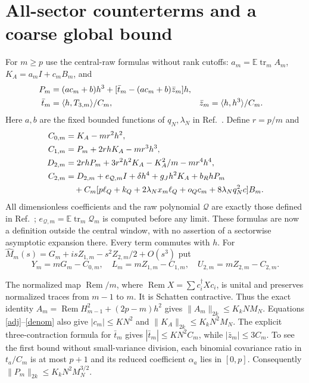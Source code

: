 \documentclass[11pt,a4paper]{article}
\newcommand{\EE}{\mathbb E}
\newcommand{\tr}{\operatorname{tr}}
\newcommand{\Rem}{\operatorname{Rem}}
\begin{document}
\newpage
\section{All-sector counterterms and a coarse global bound}
For $m\ge p$ use the central-raw formulas without rank cutoffs:
$a_m=\EE\tr_m A_m$, $K_A=a_mI+c_mB_m$, and
\begin{align}
 P_m&=(ac_m+b)h^3+[\bar t_m-(ac_m+b)\bar z_m]h,\notag\\
 \bar t_m&=\langle h,T_{3,m}\rangle/C_m,
 &\bar z_m&=\langle h,h^3\rangle/C_m.
\end{align}
Here $a,b$ are the fixed bounded functions of $q_N,\lambda_N$
in Ref.~\cite{central}. Define $r=p/m$ and
\begin{align}
 C_{0,m}&=K_A-mr^2h^2,\notag\\
 C_{1,m}&=P_m+2rhK_A-mr^3h^3,\notag\\
 D_{2,m}&=2rhP_m+3r^2h^2K_A-K_A^2/m-mr^4h^4,\notag\\
 C_{2,m}&=D_{2,m}+e_{\mathcal Q,m}I+\delta h^4
                 +g_Jh^2K_A+b_RhP_m\notag\\
 &\quad+C_m[p\ell_Q+k_Q+2\lambda_Nx_m\ell_Q
                  +o_Qc_m+8\lambda_Nq_N^2c]B_m.\label{C2}
\end{align}
All dimensionless coefficients and the raw polynomial
$\mathcal Q$ are exactly those defined in Ref.~\cite{central};
$e_{\mathcal Q,m}=\EE\tr_m\mathcal Q_m$ is computed before any
limit. These formulas are now a definition outside the central
window, with no assertion of a sectorwise asymptotic expansion there.
Every term commutes with $h$. For
$\widehat M_m(s)=G_m+isZ_{1,m}-s^2Z_{2,m}/2+O(s^3)$ put
\begin{equation}
 Y_m=mG_m-C_{0,m},\quad L_m=mZ_{1,m}-C_{1,m},\quad
 U_{2,m}=mZ_{2,m}-C_{2,m}.
\end{equation}

The normalized map $\Rem/m$, where $\Rem X=\sum c_i^\dagger Xc_i$,
is unital and preserves normalized traces from $m-1$ to $m$.
It is Schatten contractive. Thus the exact identity
$A_m=\Rem H_{m-1}^2+(2p-m)h^2$ gives
$\|A_m\|_{2k}\le K_kNM_N$. Equations \eqref{adj}--\eqref{denom}
also give $|c_m|\le KN^2$ and $\|K_A\|_{2k}\le K_kN^2M_N$.
The explicit three-contraction formula for $\bar t_m$ gives
$|\bar t_m|\le KN^2C_m$, while $|\bar z_m|\le3C_m$.
To see the first bound without small-variance division, each
binomial covariance ratio in $t_a/C_m$ is at most $p+1$ and
its reduced coefficient $\alpha_a$ lies in $[0,p]$.
Consequently $\|P_m\|_{2k}\le K_kN^2M_N^{3/2}$.
\end{document}
